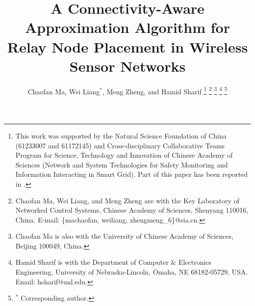 \documentclass[journal]{IEEEtran}
\begin{document}
\title{A Connectivity-Aware Approximation Algorithm for Relay Node Placement in Wireless Sensor Networks}

\author{Chaofan Ma,
        Wei Liang$^*$,
        Meng Zheng, and Hamid Sharif
\thanks{This work was supported by the Natural Science Foundation of China (61233007 and 61172145) and Cross-disciplinary Collaborative Teams Program for Science, Technology and Innovation of Chinese Academy of Sciences (Network and System Technologies for Safety Monitoring and Information Interacting in Smart Grid). Part of this paper has been reported in \cite{Ma15}.}
\thanks{Chaofan Ma, Wei Liang, and Meng Zheng are with the Key Laboratory of Networked Control Systems, Chinese Academy of Sciences, Shenyang 110016, China. E-mail: \{machaofan, weiliang, zhengmeng\_6\}@sia.cn.}
\thanks{Chaofan Ma is also with the University of Chinese Academy of Sciences, Beijing 100049, China.}
\thanks{Hamid Sharif is with the Department of Computer \& Electronics Engineering, University of Nebraska-Lincoln, Omaha, NE 68182-05729, USA. Email: hsharif@unl.edu.}
\thanks{$^*$ Corresponding author.}}















\maketitle
\end{document}
